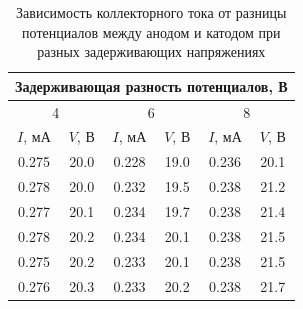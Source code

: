 \begin{table}[]
\centering
\caption{Зависимость коллекторного тока от разницы потенциалов между анодом и катодом при разных задерживающих напряжениях}
\label{tab:my-table}
\begin{tabular}{|cccccc}
\hline
\multicolumn{6}{|c|}{\cellcolor[HTML]{C6E0B4}Задерживающая   разность потенциалов, В}                                                                                                           \\ \hline
\multicolumn{2}{|c|}{4}                                       & \multicolumn{2}{c|}{6}                                         & \multicolumn{2}{c|}{8}                                         \\ \hline
\multicolumn{1}{|c|}{$I$, мА} & \multicolumn{1}{c|}{$V$,   В} & \multicolumn{1}{c|}{$I$,   мА} & \multicolumn{1}{c|}{$V$,   В} & \multicolumn{1}{c|}{$I$,   мА} & \multicolumn{1}{c|}{$V$,   В} \\ \hline
\multicolumn{1}{|c|}{0.275}   & \multicolumn{1}{c|}{20.0}     & \multicolumn{1}{c|}{0.228}     & \multicolumn{1}{c|}{19.0}     & \multicolumn{1}{c|}{0.236}     & \multicolumn{1}{c|}{20.1}     \\ \hline
\multicolumn{1}{|c|}{0.278}   & \multicolumn{1}{c|}{20.0}     & \multicolumn{1}{c|}{0.232}     & \multicolumn{1}{c|}{19.5}     & \multicolumn{1}{c|}{0.238}     & \multicolumn{1}{c|}{21.2}     \\ \hline
\multicolumn{1}{|c|}{0.277}   & \multicolumn{1}{c|}{20.1}     & \multicolumn{1}{c|}{0.234}     & \multicolumn{1}{c|}{19.7}     & \multicolumn{1}{c|}{0.238}     & \multicolumn{1}{c|}{21.4}     \\ \hline
\multicolumn{1}{|c|}{0.278}   & \multicolumn{1}{c|}{20.2}     & \multicolumn{1}{c|}{0.234}     & \multicolumn{1}{c|}{20.1}     & \multicolumn{1}{c|}{0.238}     & \multicolumn{1}{c|}{21.5}     \\ \hline
\multicolumn{1}{|c|}{0.275}   & \multicolumn{1}{c|}{20.2}     & \multicolumn{1}{c|}{0.233}     & \multicolumn{1}{c|}{20.1}     & \multicolumn{1}{c|}{0.238}     & \multicolumn{1}{c|}{21.5}     \\ \hline
\multicolumn{1}{|c|}{0.276}   & \multicolumn{1}{c|}{20.3}     & \multicolumn{1}{c|}{0.233}     & \multicolumn{1}{c|}{20.2}     & \multicolumn{1}{c|}{0.238}     & \multicolumn{1}{c|}{21.7}     \\ \hline

\end{tabular}
\end{table}
